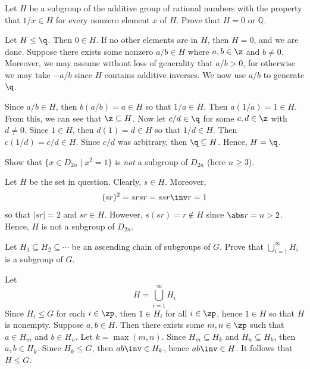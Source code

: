 \begin{exercise} \label{ex2.1.13}
    Let $H$ be a subgroup of the additive group of rational numbers with the property that $1/x \in H$ for every nonzero element $x$ of $H$. Prove that $H = 0$ or $\mathbb{Q}$.
\end{exercise}

\begin{sol}
    Let $H \leq \q$. Then $0 \in H$. If no other elements are in $H$, then $H = 0$, and we are done. Suppose there exists some nonzero $a/b \in H$ where $a, b \in \z$ and $b \neq 0$. Moreover, we may assume without loss of generality that $a/b > 0$, for otherwise we may take $-a/b$ since $H$ contains additive inverses. We now use $a/b$ to generate $\q$.

    Since $a/b \in H$, then $b(a/b) = a \in H$ so that $1/a \in H$. Then $a(1/a) = 1 \in H$. From this, we can see that $\z \subseteq H$. Now let $c/d \in \q$ for some $c, d \in \z$ with $d \neq 0$. Since $1 \in H$, then $d(1) = d \in H$ so that $1/d \in H$. Then $c(1/d) = c/d \in H$. Since $c/d$ was arbitrary, then $\q \subseteq H$. Hence, $H = \q$.
\end{sol}

\begin{exercise} \label{ex2.1.14}
    Show that $\{ x \in D_{2n} \mid x^2 = 1 \}$ is \emph{not} a subgroup of $D_{2n}$ (here $n \ge 3$).
\end{exercise}

\begin{sol}
    Let $H$ be the set in question. Clearly, $s \in H$. Moreover,
    \[(sr)^2 = srsr = ssr\inv r = 1\]
    so that $|sr| = 2$ and $sr \in H$. However, $s(sr) = r \not\in H$ since $\abs r = n > 2$. Hence, $H$ is not a subgroup of $D_{2n}$.
\end{sol}

\begin{exercise} \label{ex2.1.15}
    Let $H_1 \subseteq H_2 \subseteq \cdots$ be an ascending chain of subgroups of $G$. Prove that $\bigcup_{i=1}^\infty H_i$ is a subgroup of $G$.
\end{exercise}

\begin{sol}
    Let
    \[H = \bigcup_{i=1}^\infty H_i\]
    Since $H_i \leq G$ for each $i \in \zp$, then $1 \in H_i$ for all $i \in \zp$, hence $1 \in H$ so that $H$ is nonempty. Suppose $a, b \in H$. Then there exists some $m, n \in \zp$ such that $a \in H_m$ and $b \in H_n$. Let $k = \max(m, n)$. Since $H_m \subseteq H_k$ and $H_n \subseteq H_k$, then $a, b \in H_k$. Since $H_k \leq G$, then $ab\inv \in H_k$, hence $ab\inv \in H$. It follows that $H \leq G$.
\end{sol}


